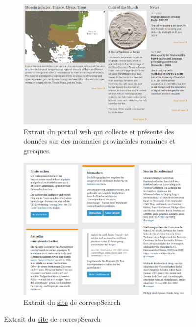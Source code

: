 \documentclass[a4paper, 12pt, twoside]{book}
\begin{document}
\newpage
\begin{figure}
    \centering
    \begin{subfigure}[b]{0.7\textwidth}
        \centering
        \includegraphics[width=1\linewidth]{img/corpusnummorum_websitepresentation.png}
        \caption{Extrait du \href{https://www.corpus-nummorum.eu/}{portail web} qui collecte et présente des données sur des monnaies provinciales romaines et grecques. }
    \end{subfigure}
        \begin{subfigure}[b]{0.7\textwidth}
        \centering
        \includegraphics[width=1\linewidth]{img/cS_websitepresentation.png}
        \caption{Extrait du \href{https://correspsearch.net/de/start.html}{site} de correspSearch}

\end{subfigure}
\end{figure}
\end{document}
